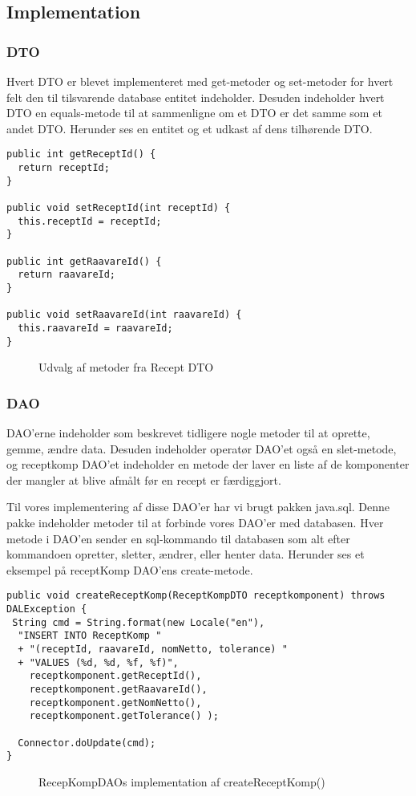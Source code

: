 \documentclass[a4paper]{article}
\begin{document}
\subsection{Implementation} %

\subsubsection{DTO} %

Hvert DTO er blevet implementeret med get-metoder og set-metoder for hvert felt den til tilsvarende database entitet indeholder. Desuden indeholder hvert DTO en equals-metode til at sammenligne om et DTO er det samme som et andet DTO. Herunder ses en entitet og et udkast af dens tilhørende DTO.

\begin{lstlisting}
public int getReceptId() {
  return receptId;
}

public void setReceptId(int receptId) {
  this.receptId = receptId;
}

public int getRaavareId() {
  return raavareId;
}

public void setRaavareId(int raavareId) {
  this.raavareId = raavareId;
}
\end{lstlisting}
\begin{figure}[h!]
  \caption{Udvalg af metoder fra Recept DTO}
\end{figure}



\subsubsection{DAO} %

DAO’erne indeholder som beskrevet tidligere nogle metoder til at oprette, gemme, ændre data. Desuden indeholder operatør DAO’et også en slet-metode, og receptkomp DAO’et indeholder en metode der laver en liste af de komponenter der mangler at blive afmålt før en recept er færdiggjort.

Til vores implementering af disse DAO’er har vi brugt pakken java.sql. Denne pakke indeholder metoder til at forbinde vores DAO’er med databasen. Hver metode i DAO’en sender en sql-kommando til databasen som alt efter kommandoen opretter, sletter, ændrer, eller henter data. Herunder ses et eksempel på receptKomp DAO’ens create-metode.

\begin{lstlisting}
public void createReceptKomp(ReceptKompDTO receptkomponent) throws DALException {
 String cmd = String.format(new Locale("en"),
  "INSERT INTO ReceptKomp " 
  + "(receptId, raavareId, nomNetto, tolerance) "
  + "VALUES (%d, %d, %f, %f)",
    receptkomponent.getReceptId(),
    receptkomponent.getRaavareId(),
    receptkomponent.getNomNetto(),
    receptkomponent.getTolerance() );

  Connector.doUpdate(cmd);
}
\end{lstlisting}
\begin{figure}[h!]
  \caption{RecepKompDAOs implementation af createReceptKomp()}
\end{figure}
\end{document}
